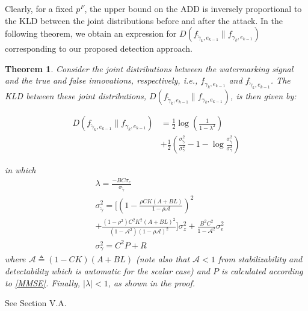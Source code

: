 \documentclass[journal,10pt]{IEEEtran}
\newtheorem{theorem}{Theorem}
\begin{document}
Clearly, for  a fixed $p^{F}$, the upper bound on the ADD is inversely proportional to the KLD between the joint distributions before and after the attack. In the following theorem, we obtain an expression for 
$ D(f_{\widetilde{\gamma}_{k}, e_{k-1}}\|f_{\gamma_{k}, e_{k-1}})$
corresponding to our proposed detection approach.

\begin{theorem}
{\black Consider the joint distributions between the watermarking signal and the true and false innovations, respectively, i.e.,  $f_{\gamma_{k}, e_{k-1}}$ and $f_{\widetilde{\gamma}_{k}, e_{k-1}}$.
The KLD between these joint distributions, $ D(f_{\widetilde{\gamma}_{k}, e_{k-1}}\|f_{\gamma_{k}, e_{k-1}})$,  is then given by:}

\begin{align}
D(f_{\widetilde{\gamma}_{k}, e_{k-1}}\|f_{\gamma_{k}, e_{k-1}}) & = \frac{1}{2}\log(\frac{1}{1-\lambda^{2}})
\nonumber \\
& +
\frac{1}{2}(\frac{\sigma_{\tilde{\gamma}}^{2}}{\sigma_{\gamma}^{2}}-1-\log\frac{\sigma_{\tilde{\gamma}}^{2}}{\sigma_{\gamma}^{2}})\label{KLD}
\end{align}

in which
\begin{align}
&\lambda=\frac{-BC\sigma_{e}}{\sigma_{\tilde{\gamma}}}\\
&\sigma_{\tilde{\gamma}}^{2}=[(1-\frac{\rho
CK(A+BL)}{1-\rho\mathcal{A}})^{2} \nonumber \\
& +\frac{(1-\rho^{2})C^{2}K^{2}(A+BL)^{2}}{(1-\mathcal{A}^{2})(1-\rho\mathcal{A})^{2}}]\sigma_{z}^{2}
+\frac{B^{2}C^{2}}{1-\mathcal{A}^{2}}\sigma_{e}^{2}\\
&\sigma_{\gamma}^{2}=C^{2}P+R\label{sigmagammanoattack}
\end{align}
where $ \mathcal{A}\triangleq (1-CK)(A+BL) $ (note also that $\mathcal{A} < 1$ from stabilizability and detectability which is automatic for the scalar case) and $P$ is calculated
according to \eqref{MMSE}. Finally, $|\lambda| < 1$, as shown in the proof.
\end{theorem}

\begin{IEEEproof}
See Section V.A.
\end{IEEEproof}
\end{document}
